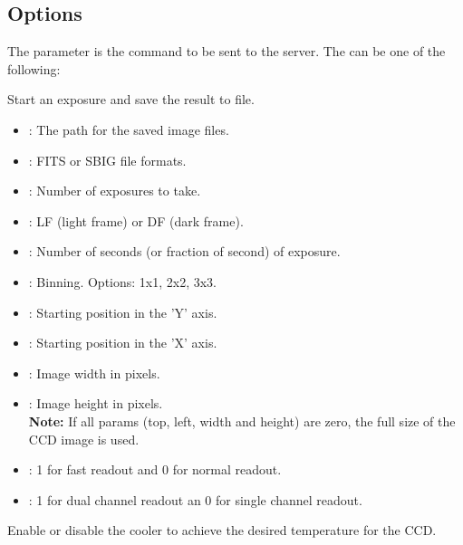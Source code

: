 \documentclass[a4paper,english]{article}
\begin{document}
\subsection{Options}

The  parameter is the command to be sent to the server. The  can be one of the following:

\begin{Description}\setlength{\itemsep}{0cm}
\item[\Arg{capture}] Start an exposure and save the result to file.

	                  
	
	\begin{itemize}
		\item {}: The path for the saved image files.
		\item {}: FITS or SBIG file formats.
		\item {}: Number of exposures to take.
		\item {}: LF (light frame) or DF (dark frame).
		\item {}: Number of seconds (or fraction of second) of exposure.
		\item {}: Binning. Options: 1x1, 2x2, 3x3.
		\item {}: Starting position in the 'Y' axis.
		\item {}: Starting position in the 'X' axis.
		\item {}: Image width in pixels.
		\item {}: Image height in pixels. \\
		
		\textbf{Note:} If all params (top, left, width and height) are zero, the full size of the CCD image is used. \\
		
		\item {}: 1 for fast readout and 0 for normal readout.
		\item {}: 1 for dual channel readout an 0 for single channel readout.
	\end{itemize}
	
\item[\Arg{settemp}] Enable or disable the cooler to achieve the desired temperature for the CCD. 


\end{Description}
\end{document}
